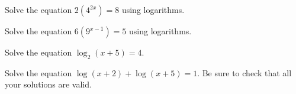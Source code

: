 \documentclass[11pt,letterpaper]{article}
\begin{document}

 Solve the equation $2(4^{2x})= 8$ using logarithms. 

\newpage

 Solve the equation $6(9^{x-1})= 5$ using logarithms. 

\newpage

 Solve the equation $\log_2(x + 5)= 4$.

\newpage

 Solve the equation $\log(x + 2) + \log(x + 5)= 1$. Be sure to check that all your solutions are valid. 


\end{document}
